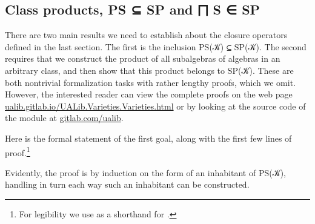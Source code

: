 \documentclass[a4paper,UKenglish,cleveref,autoref,thm-restate]{lipics-v2021}
\begin{document}
\subsection{Class products, PS ⊆ SP and ⨅ S ∈ SP}\label{ssec:class-products-and-inclusions}
There are two main results we need to establish about the closure operators defined in the last section.  The first is the inclusion \ad P\ad S(\ab 𝒦) ⊆ \ad S\ad P(\ab 𝒦). The second requires that we construct the product of all subalgebras of algebras in an arbitrary class, and then show that this product belongs to \ad S\ad P(\ab 𝒦).  These are both nontrivial formalization tasks with rather lengthy proofs, which we omit.  However, the interested reader can view the complete proofs on the web page \href{https://ualib.gitlab.io/UALib.Varieties.Varieties.html}{ualib.gitlab.io/UALib.Varieties.Varieties.html} or by looking at the source code of the \ualibVarieties module at \href{https://gitlab.com/ualib/ualib.gitlab.io/-/blob/master/UALib/Varieties/Varieties.lagda}{gitlab.com/ualib}.

Here is the formal statement of the first goal, along with the first few lines of proof.\footnote{For legibility we use  as a shorthand for
   
   
   .}
\ccpad
\begin{code}%
  
\end{code}
\ccpad
Evidently, the proof is by induction on the form of an inhabitant of \ad P\ad S(\ab 𝒦), handling in turn each way such an inhabitant can be constructed. \seedocfordetails

\end{document}

